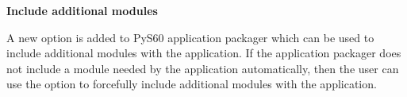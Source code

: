 {\bf Include additional modules} \break

A new option is added to PyS60 application packager which can be used to include
additional modules with the application. If the application packager does not include
a module needed by the application automatically, then the user can use the
  option to forcefully include additional modules with the
 application.